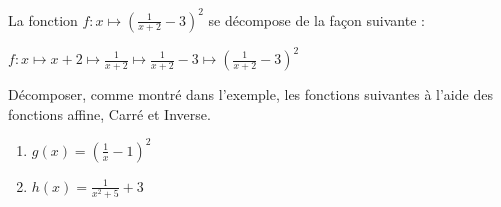 
La fonction $f:x \mapsto \left(\frac{1}{x+2}-3 \right)^2$ se décompose de la façon suivante :

$f:x\mapsto x+2 \mapsto \frac{1}{x+2} \mapsto \frac{1}{x+2}-3 \mapsto \left(\frac{1}{x+2}-3 \right)^2$


Décomposer, comme montré dans l'exemple, les fonctions suivantes à l'aide des fonctions affine, Carré et Inverse.
\begin{enumerate}
\item $g(x)=\left(\frac{1}{x}-1 \right)^2$
\item $h(x)=\frac{1}{x^2+5}+3$
\end{enumerate}